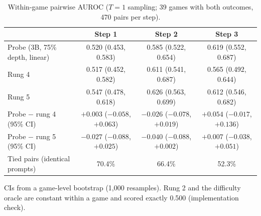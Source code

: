 \begin{table}[htbp]
\centering\small
\caption{Within-game pairwise AUROC ($T = 1$ sampling; 39 games with both outcomes, 470 pairs per step).}\label{tab:within}
\begin{tabularx}{\linewidth}{@{}Lccc@{}}
\toprule
 & Step 1 & Step 2 & Step 3 \\
\midrule
Probe (3B, 75\% depth, linear) & 0.520 (0.453, 0.583) & 0.585 (0.522, 0.654) & 0.619 (0.552, 0.687) \\
Rung 4 & 0.517 (0.452, 0.582) & 0.611 (0.541, 0.687) & 0.565 (0.492, 0.644) \\
Rung 5 & 0.547 (0.478, 0.618) & 0.626 (0.563, 0.699) & 0.612 (0.546, 0.682) \\
Probe $-$ rung 4 (95\% CI) & $+0.003$ ($-0.058$, $+0.063$) & $-0.026$ ($-0.078$, $+0.019$) & $+0.054$ ($-0.017$, $+0.136$) \\
Probe $-$ rung 5 (95\% CI) & $-0.027$ ($-0.088$, $+0.025$) & $-0.040$ ($-0.088$, $+0.002$) & $+0.007$ ($-0.038$, $+0.051$) \\
Tied pairs (identical prompts) & 70.4\% & 66.4\% & 52.3\% \\
\bottomrule
\end{tabularx}
\par\smallskip\raggedright\footnotesize
CIs from a game-level bootstrap (1,000 resamples). Rung 2 and the difficulty oracle are constant within a game and scored exactly 0.500 (implementation check).
\end{table}
